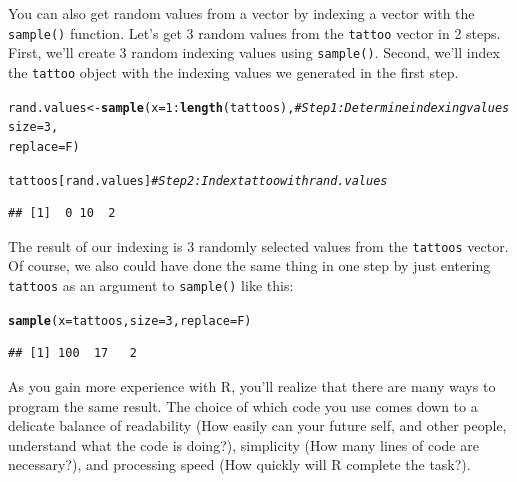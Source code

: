 \documentclass{tufte-book}\usepackage[]{graphicx}\usepackage[]{color}
\makeatletter
\newcommand{\hlnum}[1]{\textcolor[rgb]{0.686,0.059,0.569}{#1}}%
\newcommand{\hlcom}[1]{\textcolor[rgb]{0.678,0.584,0.686}{\textit{#1}}}%
\newcommand{\hlopt}[1]{\textcolor[rgb]{0,0,0}{#1}}%
\newcommand{\hlstd}[1]{\textcolor[rgb]{0.345,0.345,0.345}{#1}}%
\newcommand{\hlkwb}[1]{\textcolor[rgb]{0.69,0.353,0.396}{#1}}%
\newcommand{\hlkwc}[1]{\textcolor[rgb]{0.333,0.667,0.333}{#1}}%
\newcommand{\hlkwd}[1]{\textcolor[rgb]{0.737,0.353,0.396}{\textbf{#1}}}%
\newenvironment{kframe}{%
 \def\at@end@of@kframe{}%
 \ifinner\ifhmode%
  \def\at@end@of@kframe{\end{minipage}}%
  \begin{minipage}{\columnwidth}%
 \fi\fi%
 \def\FrameCommand##1{\hskip\@totalleftmargin \hskip-\fboxsep
 \colorbox{shadecolor}{##1}\hskip-\fboxsep
     \hskip-\linewidth \hskip-\@totalleftmargin \hskip\columnwidth}%
 \MakeFramed {\advance\hsize-\width
   \@totalleftmargin\z@ \linewidth\hsize
   \@setminipage}}%
 {\par\unskip\endMakeFramed%
 \at@end@of@kframe}
\newenvironment{knitrout}{}{} %
\makeatother
\begin{document}
\begin{footnotesize}
You can also get random values from a vector by indexing a vector with the \texttt{sample()} function. Let's get 3 random values from the \texttt{tattoo} vector in 2 steps. First, we'll create 3 random indexing values using \texttt{sample()}. Second, we'll index the \texttt{tattoo} object with the indexing values we generated in the first step.

\begin{footnotesize}
\begin{knitrout}
\color{fgcolor}\begin{kframe}
\begin{alltt}
\hlstd{rand.values} \hlkwb{<-} \hlkwd{sample}\hlstd{(}\hlkwc{x} \hlstd{=} \hlnum{1}\hlopt{:}\hlkwd{length}\hlstd{(tattoos),}  \hlcom{# Step 1: Determine indexing values}
                      \hlkwc{size} \hlstd{=} \hlnum{3}\hlstd{,}
                      \hlkwc{replace} \hlstd{= F)}

\hlstd{tattoos[rand.values]} \hlcom{# Step 2: Index tattoo with rand.values}
\end{alltt}
\begin{verbatim}
## [1]  0 10  2
\end{verbatim}
\end{kframe}
\end{knitrout}
\end{footnotesize}

The result of our indexing is 3 randomly selected values from the \texttt{tattoos} vector. Of course, we also could have done the same thing in one step by just entering \texttt{tattoos} as an argument to \texttt{sample()} like this:

\begin{footnotesize}
\begin{knitrout}
\color{fgcolor}\begin{kframe}
\begin{alltt}
\hlkwd{sample}\hlstd{(}\hlkwc{x} \hlstd{= tattoos,} \hlkwc{size} \hlstd{=} \hlnum{3}\hlstd{,} \hlkwc{replace} \hlstd{= F)}
\end{alltt}
\begin{verbatim}
## [1] 100  17   2
\end{verbatim}
\end{kframe}
\end{knitrout}
\end{footnotesize}

As you gain more experience with R, you'll realize that there are many ways to program the same result. The choice of which code you use comes down to a delicate balance of readability (How easily can your future self, and other people, understand what the code is doing?), simplicity (How many lines of code are necessary?), and processing speed (How quickly will R complete the task?).


\end{footnotesize}
\end{document}
